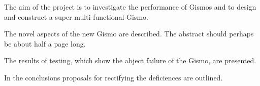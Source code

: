 The aim of the project is to investigate the performance of Gismos and
to design and construct a super multi-functional Gismo.

The novel aspects of the new Gismo are described. The abstract should
perhaps be about half a page long.

The results of testing, which show the abject failure of the Gismo,
are presented.

In the conclusions proposals for rectifying the deficiences are
outlined.


